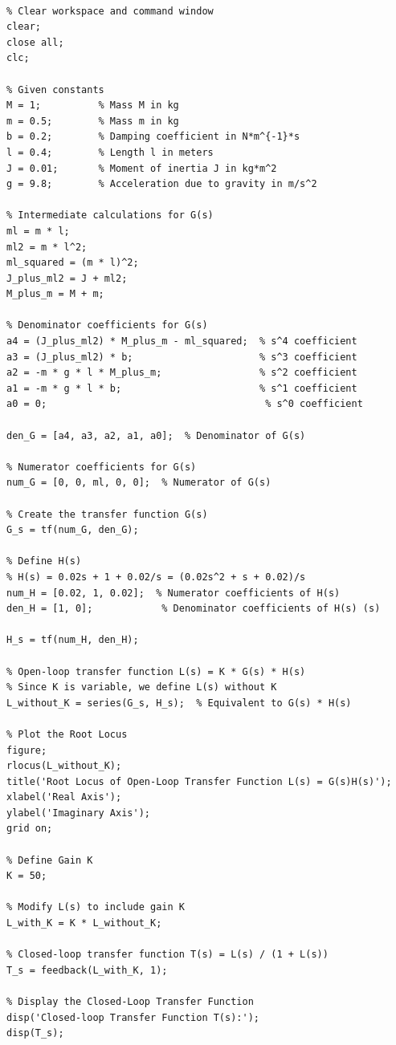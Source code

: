\documentclass{article}
\begin{document}
\begin{lstlisting}[style=MatlabStyle, caption={MATLAB Code for Root Locus and Closed-Loop Poles}]
% MATLAB code to plot the root locus and find closed-loop poles at K = 50

% Clear workspace and command window
clear;
close all;
clc;

% Given constants
M = 1;          % Mass M in kg
m = 0.5;        % Mass m in kg
b = 0.2;        % Damping coefficient in N*m^{-1}*s
l = 0.4;        % Length l in meters
J = 0.01;       % Moment of inertia J in kg*m^2
g = 9.8;        % Acceleration due to gravity in m/s^2

% Intermediate calculations for G(s)
ml = m * l;
ml2 = m * l^2;
ml_squared = (m * l)^2;
J_plus_ml2 = J + ml2;
M_plus_m = M + m;

% Denominator coefficients for G(s)
a4 = (J_plus_ml2) * M_plus_m - ml_squared;  % s^4 coefficient
a3 = (J_plus_ml2) * b;                      % s^3 coefficient
a2 = -m * g * l * M_plus_m;                 % s^2 coefficient
a1 = -m * g * l * b;                        % s^1 coefficient
a0 = 0;                                      % s^0 coefficient

den_G = [a4, a3, a2, a1, a0];  % Denominator of G(s)

% Numerator coefficients for G(s)
num_G = [0, 0, ml, 0, 0];  % Numerator of G(s)

% Create the transfer function G(s)
G_s = tf(num_G, den_G);

% Define H(s)
% H(s) = 0.02s + 1 + 0.02/s = (0.02s^2 + s + 0.02)/s
num_H = [0.02, 1, 0.02];  % Numerator coefficients of H(s)
den_H = [1, 0];            % Denominator coefficients of H(s) (s)

H_s = tf(num_H, den_H);

% Open-loop transfer function L(s) = K * G(s) * H(s)
% Since K is variable, we define L(s) without K
L_without_K = series(G_s, H_s);  % Equivalent to G(s) * H(s)

% Plot the Root Locus
figure;
rlocus(L_without_K);
title('Root Locus of Open-Loop Transfer Function L(s) = G(s)H(s)');
xlabel('Real Axis');
ylabel('Imaginary Axis');
grid on;

% Define Gain K
K = 50;

% Modify L(s) to include gain K
L_with_K = K * L_without_K;

% Closed-loop transfer function T(s) = L(s) / (1 + L(s))
T_s = feedback(L_with_K, 1);

% Display the Closed-Loop Transfer Function
disp('Closed-loop Transfer Function T(s):');
disp(T_s);


\end{lstlisting}
\end{document}
